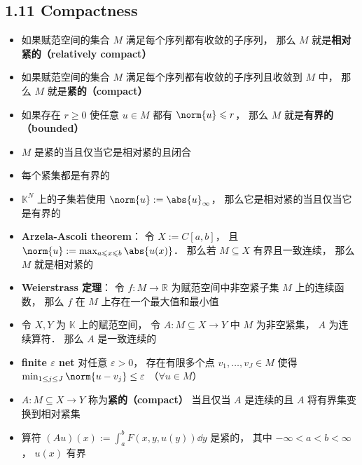 \subsection{1.11 Compactness}
\begin{itemize}
\item 如果赋范空间的集合 $M$ 满足每个序列都有收敛的子序列， 那么 $M$ 就是\textbf{相对紧的（relatively compact）}

\item 如果赋范空间的集合 $M$ 满足每个序列都有收敛的子序列且收敛到 $M$ 中， 那么 $M$ 就是\textbf{紧的（compact）}

\item 如果存在 $r \geqslant 0$ 使任意 $u \in M$ 都有 $\norm{u} \leqslant r$， 那么 $M$ 就是\textbf{有界的（bounded）}

\item $M$ 是紧的当且仅当它是相对紧的且闭合

\item 每个紧集都是有界的

\item $\mathbb K^N$ 上的子集若使用 $\norm{u} := \abs{u}_\infty$， 那么它是相对紧的当且仅当它是有界的

\item \textbf{Arzela-Ascoli theorem}： 令 $X := C[a, b]$， 且 $\norm{u} := \max_{a\leqslant x\leqslant b}\abs{u(x)}$． 那么若 $M \subseteq X$ 有界且一致连续， 那么 $M$ 就是相对紧的

\item \textbf{Weierstrass 定理}： 令 $f: M\to \mathbb R$ 为赋范空间中非空紧子集 $M$ 上的连续函数， 那么 $f$ 在 $M$ 上存在一个最大值和最小值

\item 令 $X, Y$ 为 $\mathbb K$ 上的赋范空间， 令 $A: M \subseteq X \to Y$ 中 $M$ 为非空紧集， $A$ 为连续算符． 那么 $A$ 是一致连续的

\item \textbf{finite $\varepsilon$ net} 对任意 $\varepsilon > 0$， 存在有限多个点 $v_1, \dots, v_J \in M$ 使得 $\min_{1\le j\le J}\norm{u-v_j} \le \varepsilon$ （$\forall u\in M$）

\item $A: M \subseteq X \to Y$ 称为\textbf{紧的（compact）} 当且仅当 $A$ 是连续的且 $A$ 将有界集变换到相对紧集

\item 算符 $(Au)(x) := \int_a^b F(x, y, u(y)) \dd{y}$ 是紧的， 其中 $-\infty < a < b < \infty$， $u(x)$ 有界
\end{itemize}


